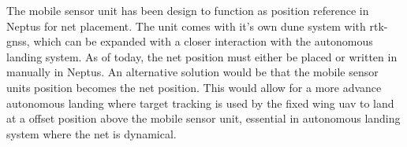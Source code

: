 The mobile sensor unit has been design to function as position reference in Neptus for net placement. The unit comes with it's own \gls{dune} system with \gls{rtk-gnss}, which can be expanded with a closer interaction with the autonomous landing system. As of today, the net position must either be placed or written in manually in Neptus. An alternative solution would be that the mobile sensor units position becomes the net position. This would allow for a more advance autonomous landing where target tracking is used by the fixed wing \gls{uav} to land at a offset position above the mobile sensor unit, essential in autonomous landing system where the net is dynamical.
